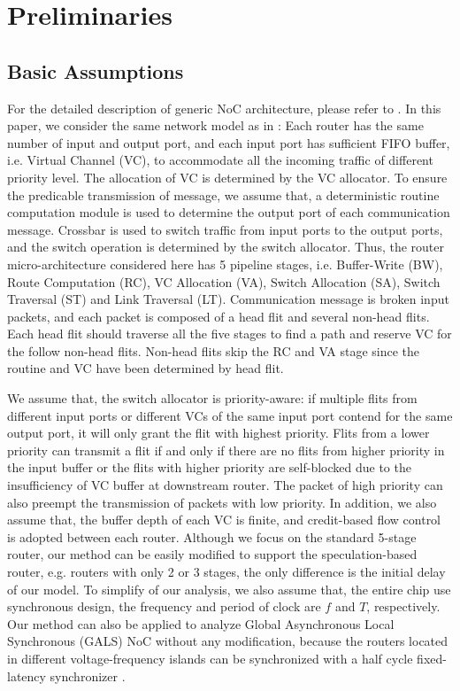 \documentclass[10pt,journal]{IEEEtran}
\begin{document}
\section{Preliminaries}\label{model}
\subsection{Basic Assumptions}
For the detailed description of generic NoC architecture, please refer to \cite{jerger2009chip}. In this paper, we consider the same network model as in \cite{627905}\cite{Shi:2008:RCA:1397757.1397996}\cite{707545}\cite{73}: Each router has the same number of input and output port, and each input port has sufficient FIFO buffer, i.e. Virtual Channel (VC), to accommodate all the incoming traffic of different priority level. The allocation of VC is determined by the VC allocator. To ensure the predicable transmission of message, we assume that, a deterministic routine computation module is used to determine the output port of each communication message. Crossbar is used to switch traffic from input ports to the output ports, and the switch operation is determined by the switch allocator. Thus, the router micro-architecture considered here has 5 pipeline stages, i.e. Buffer-Write (BW), Route Computation (RC), VC Allocation (VA), Switch Allocation (SA), Switch Traversal (ST) and Link Traversal (LT). Communication message is broken input packets, and each packet is composed of a head flit and several non-head flits. Each head flit should traverse all the five stages to find a path and reserve VC for the follow non-head flits. Non-head flits skip the RC and VA stage since the routine and VC have been determined by head flit.

We assume that, the switch allocator is priority-aware: if multiple flits from different input ports or different VCs of the same input port contend for the same output port, it will only grant the flit with highest priority. Flits from a lower priority can transmit a flit if and only if there are no flits from higher priority in the input buffer or the flits with higher priority are self-blocked due to the insufficiency of VC buffer at downstream router. The packet of high priority can also preempt the transmission of packets with low priority. In addition, we also assume that, the buffer depth of each VC is finite, and credit-based flow control is adopted between each router. Although we focus on the standard 5-stage router, our method can be easily modified to support the speculation-based router, e.g. routers with only 2 or 3 stages, the only difference is the initial delay of our model. To simplify of our analysis, we also assume that, the entire chip use synchronous design, the frequency and period of clock are $f$ and $T$, respectively. Our method can also be applied to analyze Global Asynchronous Local Synchronous (GALS) NoC without any modification, because the routers located in different voltage-frequency islands can be synchronized with a half cycle fixed-latency synchronizer \cite{5476986}.
\end{document}
